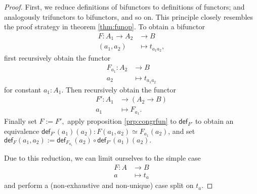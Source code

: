 \documentclass[a4paper]{article}
\theoremstyle{definition}
\theoremstyle{remark}
\renewcommand{\equiv}{\simeq}
\newcommand{\nm}{\mathsf}
\newcommand{\fndef}[1]{\nm{def}_{#1}}
\begin{document}
\begin{proof}
  First, we reduce definitions of bifunctors to definitions of functors; and analogously
  trifunctors to bifunctors, and so on. This principle closely resembles the proof
  strategy in theorem \ref{thm:funop}. To obtain a bifunctor
  \begin{align*}
    F : A_1 \to A_2 &\to     B\\
        (a_1,a_2)   &\mapsto t_{a_1a_2},
  \end{align*}
  first recursively obtain the functor
  \begin{align*}
    F_{a_1} : A_2 &\to     B\\
              a_2 &\mapsto t_{a_1a_2}
  \end{align*}
  for constant $a_1 : A_1.$
  Then recursively obtain the functor
  \begin{align*}
    F' : A_1 &\to     (A_2 \to B)\\
         a_1 &\mapsto F_{a_1}.
  \end{align*}
  Finally set $F := F',$ apply proposition \ref{prp:congrfun} to $\fndef{F'}$ to obtain
  an equivalence $\fndef{F'}(a_1)(a_2) : F(a_1,a_2) \equiv F_{a_1}(a_2)$, and set
  $\fndef{F}(a_1,a_2) := \fndef{F_{a_1}}(a_2) \circ \fndef{F'}(a_1)(a_2).$

  Due to this reduction, we can limit ourselves to the simple case
  \begin{align*}
    F : A &\to     B\\
        a &\mapsto t_a
  \end{align*}
  and perform a (non-exhaustive and non-unique) case split on $t_a.$


\end{proof}
\end{document}
